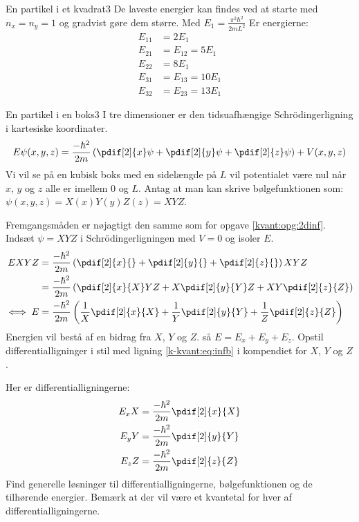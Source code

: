 \begin{opgave}{En partikel i et kvadrat}{3}
De laveste energier kan findes ved at starte med $n_x = n_y = 1$ og gradvist gøre dem større. Med $E_1 = \frac{\pi^2\hbar^2}{2mL^2}$ Er energierne:
\begin{align*}
    E_{11} &= 2E_1\\
    E_{21} &= E_{12} = 5E_1\\
    E_{22} &= 8E_1\\
    E_{31} &= E_{13} = 10E_1\\
    E_{32} &= E_{23} = 13E_1
\end{align*}
\end{opgave}


\begin{opgave}{En partikel i en boks}{3}
I tre dimensioner er den tidsuafhængige Schrödingerligning i kartesiske koordinater.
$$
E\psi(x,y,z) = \frac{-\hbar^2}{2m}\left(\pdif[2]{x}\psi +\pdif[2]{y}\psi+\pdif[2]{z}\psi\right) + V(x,y,z)
$$
Vi vil se på en kubisk boks med en sidelængde på $L$ vil potentialet være nul når $x$, $y$ og $z$ alle er imellem 0 og $L$.
Antag at man kan skrive bølgefunktionen som: $\psi(x,y,z) = X(x)Y(y)Z(z) = XYZ$.

Fremgangsmåden er nøjagtigt den samme som for opgave \ref{kvant:opg:2dinf}.
\opg Indsæt $\psi = XYZ$ i Schrödingerligningen med $V=0$ og isoler $E$.
\begin{align*}
EXYZ &= \frac{-\hbar^2}{2m}\left(\pdif[2]{x}{}+\pdif[2]{y}{}+\pdif[2]{z}{}\right)XYZ\\
&= \frac{-\hbar^2}{2m}\left(\pdif[2]{x}{X}YZ+X\pdif[2]{y}{Y}Z+XY\pdif[2]{z}{Z}\right)\\
\iff E&= \frac{-\hbar^2}{2m}\left(\frac{1}{X}\pdif[2]{x}{X}+\frac{1}{Y}\pdif[2]{y}{Y}+\frac{1}{Z}\pdif[2]{z}{Z}\right)
\end{align*}
\opg Energien vil bestå af en bidrag fra $X$, $Y$ og $Z$. så $E=E_x+E_y+E_z$. Opstil differentialligninger i stil med ligning \eqref{k-kvant:eq:infb} i kompendiet for $X$, $Y$ og $Z$.

Her er differentialligningerne:
\begin{align*}
    E_xX &= \frac{-\hbar^2}{2m}\pdif[2]{x}{X}\\
    E_yY &= \frac{-\hbar^2}{2m}\pdif[2]{y}{Y}\\
    E_zZ &= \frac{-\hbar^2}{2m}\pdif[2]{z}{Z}
\end{align*}
\opg Find generelle løsninger til differentialligningerne, bølgefunktionen og de tilhørende energier. Bemærk at der vil være et kvantetal for hver af differentialligningerne. 


\end{opgave}
